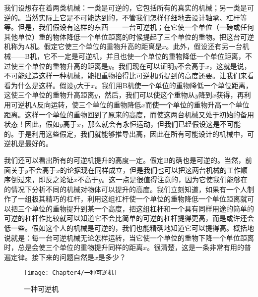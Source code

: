 我们设想存在着两类机械：一类是可逆的，它包括所有的真实的机械；另一类是可逆的。当然实际上它是不可能达到的，不管我们怎样仔细地去设计轴承、杠杆等等。但是，我们假设有这样的东西——一台可逆机；在它使一个单位（一磅或任何其他单位）重的物体降低一个单位距离的时候提起了三个单位的重物。把这台可逆机称为A机。假定它使三个单位的重物升高的距离是$ x $。此外，假设还有另一台机械——B机，它不一定是可逆机，并且也使一个单位的重物降低一个单位距离，不过使三个单位的重物升高的距离是$ y $。我们现在可以证明$ y $不会高于$ x $，这就是说，不可能建造这样一种机械，能把重物抬得比可逆机所提到的高度还要。让我们来看看为什么是这样。假设$ y $大于$ x $。我们用B机使一个单位的重物降低一个单位距离，这使三个单位的重物升高距离$y$，然后，我们可以使这个重物从$ y $降到$ x $获得，再利用可逆机A反向运转，使三个单位的重物降低$ x $而使一个单位的重物升高一个单位距离。这样一个单位的重物回到了原来的高度，而使这两台机械又处于初始的备用状态！因此，假如$ y $高于$ x $，那么就会有永恒运动，但我们已经假设这是不可能的。于是利用这些假定，我们就能够推导出高，因此在所有可能设计的机械中，可逆机是最好的。

我们还可以看出所有的可逆机提升的高度一定。假定B的确也是可逆的。当然，前面关于$ y $不会高于$ x $的论据现在同样成立，但是我们也可以把这两台机械的工作顺序倒过来，即反之论证$ x $不高于$ y $。这一点是很值得注意的，因为它使我们能够在的情况下分析不同的机械对物体可以提升的高度。我们立刻知道，如果有一个人制作了一组极其精巧的杠杆，利用这组杠杆使一个单位的重物降低一个单位距离就可以把三个单位的重物提升到某一个高度，把这组杠杆和一个具有同样用途的简单的可逆的杠杆作比较就可以知道它不会比简单的可逆的杠杆提得更高，而是或许还会低一些。假如这个人的机械是可逆的，我们也能精确地知道它可以提得高。概括地说就是：每一台可逆机械无论怎样运转，当它使一个单位的重物下降一个单位距离时，总是会使三个单位的重物提升同样的距离$ x $。很清楚，这是一条非常有用的普遍定律。接下来的问题自然是$ x $是多少？

\begin{wrapfigure}{l}{0.45\textwidth}
    \centering
    \texttt{[image: Chapter4/一种可逆机]}
    \caption{一种可逆机}
    \label{figure:一种可逆机}
\end{wrapfigure}

